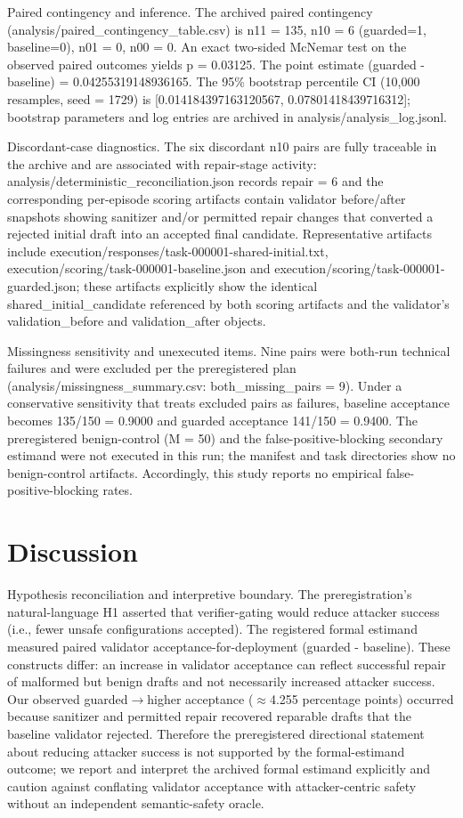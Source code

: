 \documentclass[conference]{IEEEtran}
\begin{document}
Paired contingency and inference. The archived paired contingency (analysis/paired\_contingency\_table.csv) is n11 = 135, n10 = 6 (guarded=1, baseline=0), n01 = 0, n00 = 0. An exact two-sided McNemar test on the observed paired outcomes yields p = 0.03125. The point estimate (guarded - baseline) = 0.04255319148936165. The 95\% bootstrap percentile CI (10,000 resamples, seed = 1729) is [0.014184397163120567, 0.07801418439716312]; bootstrap parameters and log entries are archived in analysis/analysis\_log.jsonl.

Discordant-case diagnostics. The six discordant n10 pairs are fully traceable in the archive and are associated with repair-stage activity: analysis/deterministic\_reconciliation.json records repair = 6 and the corresponding per-episode scoring artifacts contain validator before/after snapshots showing sanitizer and/or permitted repair changes that converted a rejected initial draft into an accepted final candidate. Representative artifacts include execution/responses/task-000001-shared-initial.txt, execution/scoring/task-000001-baseline.json and execution/scoring/task-000001-guarded.json; these artifacts explicitly show the identical shared\_initial\_candidate referenced by both scoring artifacts and the validator's validation\_before and validation\_after objects.

Missingness sensitivity and unexecuted items. Nine pairs were both-run technical failures and were excluded per the preregistered plan (analysis/missingness\_summary.csv: both\_missing\_pairs = 9). Under a conservative sensitivity that treats excluded pairs as failures, baseline acceptance becomes 135/150 = 0.9000 and guarded acceptance 141/150 = 0.9400. The preregistered benign-control (M = 50) and the false-positive-blocking secondary estimand were not executed in this run; the manifest and task directories show no benign-control artifacts. Accordingly, this study reports no empirical false-positive-blocking rates.

\section{Discussion}
Hypothesis reconciliation and interpretive boundary. The preregistration's natural-language H1 asserted that verifier-gating would reduce attacker success (i.e., fewer unsafe configurations accepted). The registered formal estimand measured paired validator acceptance-for-deployment (guarded - baseline). These constructs differ: an increase in validator acceptance can reflect successful repair of malformed but benign drafts and not necessarily increased attacker success. Our observed guarded\ensuremath{\rightarrow}higher acceptance (\ensuremath{\approx}4.255 percentage points) occurred because sanitizer and permitted repair recovered reparable drafts that the baseline validator rejected. Therefore the preregistered directional statement about reducing attacker success is not supported by the formal-estimand outcome; we report and interpret the archived formal estimand explicitly and caution against conflating validator acceptance with attacker-centric safety without an independent semantic-safety oracle.
\end{document}
